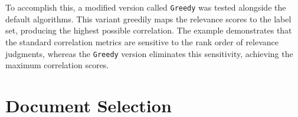 \\\\
To accomplish this, a modified version called \texttt{Greedy} was tested alongside the default algorithms. This variant greedily maps the relevance scores to the label set, producing the highest possible correlation. The example demonstrates that the standard correlation metrics are sensitive to the rank order of relevance judgments, whereas the \texttt{Greedy} version eliminates this sensitivity, achieving the maximum correlation scores.


\section{Document Selection}\label{eval-document-selection}

